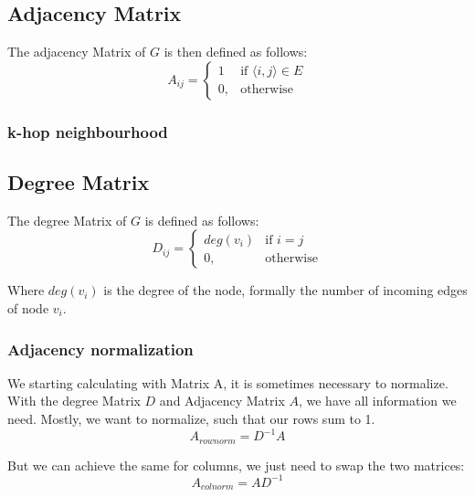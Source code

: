 \subsection{Adjacency Matrix}

The adjacency Matrix of $G$ is then defined as follows:
\begin{equation}
    A_{ij} =    
    \begin{cases}
        1  & \text{if } \langle i,j \rangle \in E \\
        0, & \text{otherwise}
    \end{cases}
\end{equation}

\subsubsection{k-hop neighbourhood}

\subsection{Degree Matrix}

The degree Matrix of $G$ is defined as follows:
\begin{equation}
    D_{ij} =    
    \begin{cases}
        deg(v_i)  & \text{if } i = j \\
        0, & \text{otherwise}
    \end{cases}
\end{equation}

Where $deg(v_i)$ is the degree of the node, formally the number of incoming edges of node $v_i$.

\subsubsection{Adjacency normalization}
We starting calculating with Matrix A, it is sometimes necessary to normalize.
With the degree Matrix $D$ and Adjacency Matrix $A$, we have all information we need.
Mostly, we want to normalize, such that our rows sum to 1.
\begin{equation}
    A_{rownorm} = D^{-1} A
\end{equation}

But we can achieve the same for columns, we just need to swap the two matrices:
\begin{equation}
    A_{colnorm} = A D^{-1}
\end{equation}

